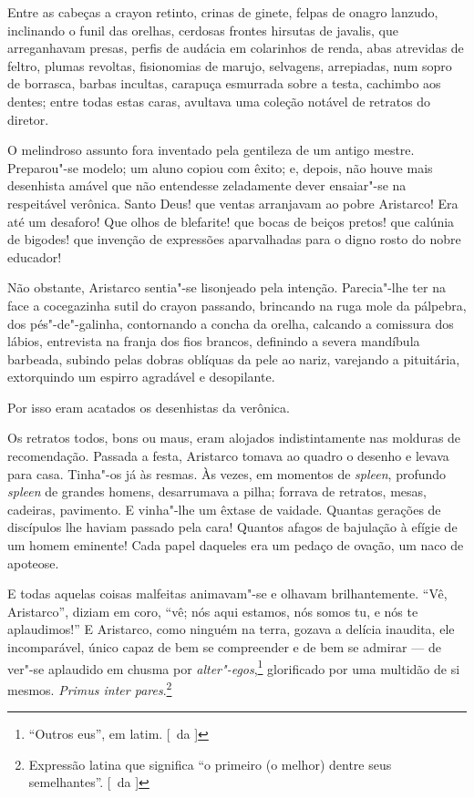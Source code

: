 Entre as cabeças a
crayon retinto, crinas de ginete, felpas de onagro lanzudo, inclinando
o funil das orelhas, cerdosas frontes hirsutas de javalis, que
arreganhavam presas, perfis de audácia em colarinhos de renda, abas
atrevidas de feltro, plumas revoltas, fisionomias de marujo, selvagens,
arrepiadas, num sopro de borrasca, barbas incultas, carapuça esmurrada
sobre a testa, cachimbo aos dentes; entre todas estas caras, avultava
uma coleção notável de retratos do diretor. 


O melindroso assunto fora
inventado pela gentileza de um antigo mestre. Preparou"-se modelo; um
aluno copiou com êxito; e, depois, não houve mais desenhista amável que
não entendesse zeladamente dever ensaiar"-se na respeitável verônica.
Santo Deus! que ventas arranjavam ao pobre Aristarco! Era até um
desaforo! Que olhos de blefarite! que bocas de beiços pretos! que
calúnia de bigodes! que invenção de expressões aparvalhadas para o
digno rosto do nobre educador! 

Não obstante, Aristarco sentia"-se
lisonjeado pela intenção. Parecia"-lhe ter na face a cocegazinha sutil
do crayon passando, brincando na ruga mole da pálpebra, dos
pés"-de"-galinha, contornando a concha da orelha, calcando a
comissura dos lábios, entrevista na franja dos fios brancos, definindo
a severa mandíbula barbeada, subindo pelas dobras oblíquas da pele ao
nariz, varejando a pituitária, extorquindo um espirro agradável e
desopilante. 

Por isso eram acatados os desenhistas da verônica. 

Os retratos todos, bons ou maus, eram alojados indistintamente nas
molduras de recomendação. Passada a festa, Aristarco tomava ao quadro o
desenho e levava para casa. Tinha"-os já às resmas. Às vezes, em
momentos de \textit{spleen}, profundo \textit{spleen} de grandes homens, desarrumava a
pilha; forrava de retratos, mesas, cadeiras, pavimento. E vinha"-lhe
um êxtase de vaidade. Quantas gerações de discípulos lhe haviam passado
pela cara! Quantos afagos de bajulação à efígie de um homem eminente!
Cada papel daqueles era um pedaço de ovação, um naco de apoteose. 

E todas aquelas coisas malfeitas animavam"-se e olhavam brilhantemente.
``Vê, Aristarco'', diziam em coro, ``vê; nós aqui estamos, nós somos tu, e
nós te aplaudimos!'' E Aristarco, como ninguém na terra,
gozava a delícia inaudita, ele incomparável, único capaz de bem se
compreender e de bem se admirar --- de ver"-se aplaudido em chusma por
\textit{alter"-egos},\footnote{ ``Outros eus'', em latim. [~da ]} 
glorificado por uma multidão de si mesmos. \textit{Primus inter
pares}.\footnote{ Expressão latina que significa ``o primeiro (o melhor) 
dentre seus semelhantes''. [~da ]}

